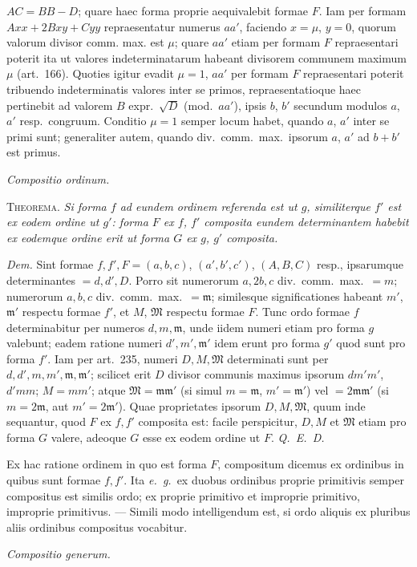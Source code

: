 $AC=BB-D$; quare haec forma proprie aequivalebit formae $F$. Iam per formam $Axx+2Bxy+Cyy$ repraesentatur numerus $aa'$, faciendo $x=\mu$, $y=0$, quorum valorum divisor comm. max. est $\mu$; quare $aa'$ etiam per formam $F$ repraesentari poterit ita ut valores indeterminatarum habeant divisorem communem maximum $\mu$ (art.~166). Quoties igitur evadit $\mu=1$, $aa'$ per formam $F$ repraesentari poterit tribuendo indeterminatis valores inter se primos, repraesentatioque haec pertinebit ad valorem $B$ expr.\ $\surd D$ (mod.\ $aa'$), ipsis $b$, $b'$ secundum modulos $a$, $a'$ resp.\ congruum. Conditio $\mu=1$ semper locum habet, quando $a$, $a'$ inter se primi sunt; generaliter autem, quando div.\ comm.\ max.\ ipsorum $a$, $a'$ ad $b+b'$ est primus.

\begin{center}
\textit{Compositio ordinum.}
\end{center}

\textsc{Theorema.} \textit{Si forma $f$ ad eundem ordinem referenda est ut $g$, similiterque $f'$ est ex eodem ordine ut $g'$: forma $F$ ex $f$, $f'$ composita eundem determinantem habebit ex eodemque ordine erit ut forma $G$ ex $g$, $g'$ composita.}

\textit{Dem.} Sint formae $f,f',F=(a,b,c)$, $(a',b',c')$, $(A,B,C)$ resp., ipsarumque determinantes $=d,d',D$. Porro sit numerorum $a,2b,c$ div.\ comm.\ max.\ $=m$; numerorum $a,b,c$ div.\ comm.\ max.\ $=\mathfrak{m}$; similesque significationes habeant $m'$, $\mathfrak{m}'$ respectu formae $f'$, et $M$, $\mathfrak{M}$ respectu formae $F$. Tunc ordo formae $f$ determinabitur per numeros $d,m,\mathfrak{m}$, unde iidem numeri etiam pro forma $g$ valebunt; eadem ratione numeri $d',m',\mathfrak{m}'$ idem erunt pro forma $g'$ quod sunt pro forma $f'$. Iam per art.~235, numeri $D,M,\mathfrak{M}$ determinati sunt per $d,d',m,m',\mathfrak{m},\mathfrak{m}'$; scilicet erit $D$ divisor communis maximus ipsorum $dm'm'$, $d'mm$; $M=mm'$; atque $\mathfrak{M}=\mathfrak{m}\mathfrak{m}'$ (si simul $m=\mathfrak{m}$, $m'=\mathfrak{m}'$) vel $=2\mathfrak{m}\mathfrak{m}'$ (si $m=2\mathfrak{m}$, aut $m'=2\mathfrak{m}'$). Quae proprietates ipsorum $D,M,\mathfrak{M}$, quum inde sequantur, quod $F$ ex $f,f'$ composita est: facile perspicitur, $D,M$ et $\mathfrak{M}$ etiam pro forma $G$ valere, adeoque $G$ esse ex eodem ordine ut $F$. \textit{Q.~E.~D.}

Ex hac ratione ordinem in quo est forma $F$, compositum dicemus ex ordinibus in quibus sunt formae $f,f'$. Ita \textit{e.~g.}\ ex duobus ordinibus proprie primitivis semper compositus est similis ordo; ex proprie primitivo et improprie primitivo, improprie primitivus. --- Simili modo intelligendum est, si ordo aliquis ex pluribus aliis ordinibus compositus vocabitur.
\begin{center}
\textit{Compositio generum.}
\end{center}

